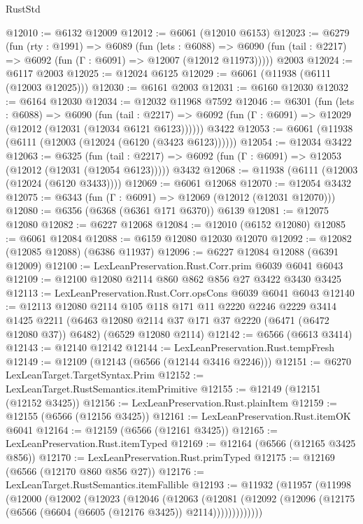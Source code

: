 \begin{lexlean}{RustStd}
\begin{coremodule}
{\begin{coremodule}
{{{{{{{{{{{{{{{{{{{{{{{{{{@12010 := @6132 @12009
@12012 := @6061 (@12010 @6153)
@12023 := @6279
    (fun (rty : @1991) =>
    @6089
      (fun (lets : @6088) =>
      @6090 (fun (tail : @2217) => @6092 (fun (Γ : @6091) => @12007 (@12012 @11973)))))
    @2003
@12024 := @6117 @2003
@12025 := @12024 @6125
@12029 := @6061 (@11938 (@6111 (@12003 @12025)))
@12030 := @6161 @2003
@12031 := @6160 @12030
@12032 := @6164 @12030
@12034 := @12032 @11968 @7592
@12046 := @6301
    (fun (lets : @6088) =>
    @6090
      (fun (tail : @2217) =>
      @6092 (fun (Γ : @6091) => @12029 (@12012 (@12031 (@12034 @6121 @6123))))))
    @3422
@12053 := @6061 (@11938 (@6111 (@12003 (@12024 (@6120 (@3423 @6123))))))
@12054 := @12034 @3422
@12063 := @6325
    (fun (tail : @2217) => @6092 (fun (Γ : @6091) => @12053 (@12012 (@12031 (@12054 @6123)))))
    @3432
@12068 := @11938 (@6111 (@12003 (@12024 (@6120 @3433))))
@12069 := @6061 @12068
@12070 := @12054 @3432
@12075 := @6343 (fun (Γ : @6091) => @12069 (@12012 (@12031 @12070)))
@12080 := @6356 (@6368 (@6361 @171 @6370)) @6139
@12081 := @12075 @12080
@12082 := @6227 @12068
@12084 := @12010 (@6152 @12080)
@12085 := @6061 @12084
@12088 := @6159 @12080 @12030 @12070
@12092 := @12082 (@12085 @12088) (@6386 @11937)
@12096 := @6227 @12084 @12088 (@6391 @12009)
@12100 := LexLeanPreservation.Rust.Corr.prim @6039 @6041 @6043
@12109 := @12100 @12080 @2114 @860 @862 @856 @27 @3422 @3430 @3425
@12113 := LexLeanPreservation.Rust.Corr.opsCons @6039 @6041 @6043
@12140 := @12113
    @12080
    @2114
    @105
    @118
    @171
    @11
    @2220
    @2246
    @2229
    @3414
    @1425
    @2211
    (@6463 @12080 @2114 @37 @171 @37 @2220 (@6471 (@6472 @12080 @37)) @6482)
    (@6529 @12080 @2114)
@12142 := @6566 (@6613 @3414)
@12143 := @12140 @12142
@12144 := LexLeanPreservation.Rust.tempFresh
@12149 := @12109 (@12143 (@6566 (@12144 @3416 @2246)))
@12151 := @6270 LexLeanTarget.TargetSyntax.Prim
@12152 := LexLeanTarget.RustSemantics.itemPrimitive
@12155 := @12149 (@12151 (@12152 @3425))
@12156 := LexLeanPreservation.Rust.plainItem
@12159 := @12155 (@6566 (@12156 @3425))
@12161 := LexLeanPreservation.Rust.itemOK @6041
@12164 := @12159 (@6566 (@12161 @3425))
@12165 := LexLeanPreservation.Rust.itemTyped
@12169 := @12164 (@6566 (@12165 @3425 @856))
@12170 := LexLeanPreservation.Rust.primTyped
@12175 := @12169 (@6566 (@12170 @860 @856 @27))
@12176 := LexLeanTarget.RustSemantics.itemFallible
@12193 := @11932
    (@11957
      (@11998
        (@12000
          (@12002
            (@12023
              (@12046
                (@12063
                  (@12081
                    (@12092 (@12096 (@12175 (@6566 (@6604 (@6605 (@12176 @3425)) @2114)))))))))))))
}}}}}}}}}}}}}}}}}}}}}}}}}}
\end{coremodule}}
\end{coremodule}
\end{lexlean}
